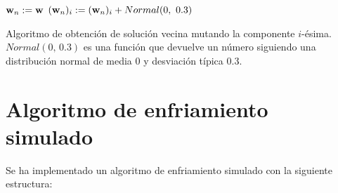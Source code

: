 \documentclass{article}
\newenvironment{algo}{
	\vspace*{0.5cm}
	\begin{algorithm}[H]}{
	\end{algorithm}
	\vspace*{0.5cm}
}
\begin{document}
\begin{algo}
	\label{vecina}
	\BlankLine
		
	$\normalfont \textbf w_n := \normalfont \textbf w$\;
	$(\normalfont \textbf w_n)_i := (\normalfont \textbf w_n)_i + Normal(0,\ 0.3)$\;
	\vspace{0.2cm}
	\caption{Algoritmo de obtención de solución vecina mutando la componente $i$-ésima. $Normal(0,\, 0.3)$ es una función que devuelve un número siguiendo una distribución normal de media $0$ y desviación típica $0.3$.}
\end{algo}

\section{Algoritmo de enfriamiento simulado}

Se ha implementado un algoritmo de enfriamiento simulado con la siguiente estructura:
\end{document}
